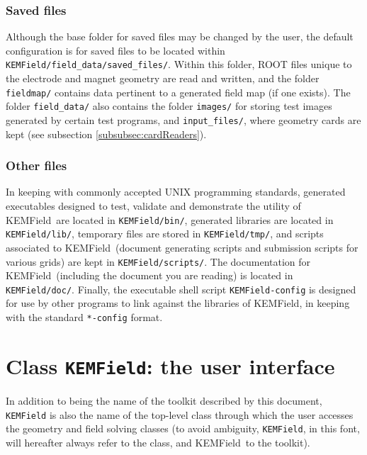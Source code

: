 \documentclass[11pt,a4paper,oneside]{article}
\newcommand{\kemfield}    {{\sc KEMField}}
\begin{document}
\subsubsection{Saved files}
\label{subsubsec:saved}

Although the base folder for saved files may be changed by the user, the default configuration is for saved files to be located within \texttt{KEMField/field\_data/saved\_files/}.  Within this folder, ROOT files unique to the electrode and magnet geometry are read and written, and the folder \texttt{fieldmap/} contains data pertinent to a generated field map (if one exists).  The folder \texttt{field\_data/} also contains the folder \texttt{images/} for storing test images generated by certain test programs, and \texttt{input\_files/}, where geometry cards are kept (see subsection \ref{subsubsec:cardReaders}).  

\subsubsection{Other files}
\label{subsubsec:other}

In keeping with commonly accepted UNIX programming standards, generated executables designed to test, validate and demonstrate the utility of \kemfield\ are located in \texttt{KEMField/bin/}, generated libraries are located in \texttt{KEMField/lib/}, temporary files are stored in \texttt{KEMField/tmp/}, and scripts associated to \kemfield\ (document generating scripts and submission scripts for various grids) are kept in \texttt{KEMField/scripts/}.  The documentation for \kemfield\ (including the document you are reading) is located in \texttt{KEMField/doc/}.  Finally, the executable shell script \texttt{KEMField-config} is designed for use by other programs to link against the libraries of \kemfield, in keeping with the standard \texttt{*-config} format.  

\section{Class \texttt{KEMField}: the user interface}
\label{KEMField}

In addition to being the name of the toolkit described by this document, \texttt{KEMField} is also the name of the top-level class through which the user accesses the geometry and field solving classes (to avoid ambiguity, \texttt{KEMField}, in this font, will hereafter always refer to the class, and \kemfield\ to the toolkit).  
\end{document}
